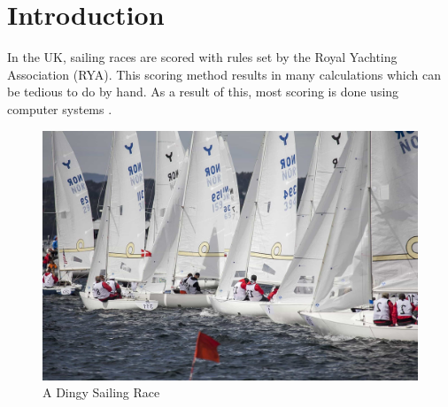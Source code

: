 \documentclass{l4proj}
\begin{document}
%
%
%
%
%
%
%
%
\chapter{Introduction}


In the UK, sailing races are scored with rules set by the Royal Yachting Association (RYA).
This scoring method results in many calculations which can be tedious to do by hand. As a result of this, most scoring is done using computer systems \citep{RYAscore}.

\begin{figure}[H]
    \centering
    \includegraphics[width=0.7\linewidth]{images/SailingRace.jpg} 

    \caption{A Dingy Sailing Race \citep{SailingRace}
    }

    \label{fig:SailingRace} 
\end{figure}
\end{document}
